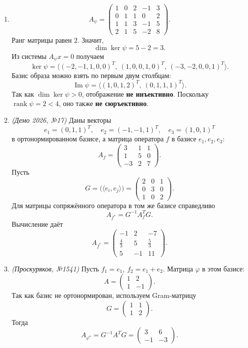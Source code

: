 \begin{enumerate}
\item
\[
A_\psi=\begin{pmatrix}
1&0&2&-1&3\\
0&1&1&0&2\\
1&1&3&-1&5\\
2&1&5&-2&8
\end{pmatrix}.
\]
Ранг матрицы равен \(2\). Значит,
\[
\dim\ker\psi=5-2=3.
\]
Из системы \(A_\psi x=0\) получаем
\[
\ker\psi=\langle (-2,-1,1,0,0)^T,\ (1,0,0,1,0)^T,\ (-3,-2,0,0,1)^T\rangle.
\]
Базис образа можно взять по первым двум столбцам:
\[
\operatorname{Im}\psi=\langle (1,0,1,2)^T,\ (0,1,1,1)^T\rangle.
\]
Так как \(\dim\ker\psi>0\), отображение \textbf{не инъективно}. Поскольку \(\operatorname{rank}\psi=2<4\), оно также \textbf{не сюръективно}.

\item \textit{(Демо 2026, №17)}
Даны векторы
\[
e_1=(0,1,1)^T,\quad e_2=(-1,-1,1)^T,\quad e_3=(1,0,1)^T
\]
в ортонормированном базисе, а матрица оператора \(f\) в базисе \(e_1,e_2,e_3\):
\[
A_f=\begin{pmatrix}
3&1&1\\
1&5&0\\
-3&2&7
\end{pmatrix}.
\]
Пусть
\[
G=\bigl(\langle e_i,e_j\rangle\bigr)=
\begin{pmatrix}
2&0&1\\
0&3&0\\
1&0&2
\end{pmatrix}.
\]
Для матрицы сопряжённого оператора в том же базисе справедливо
\[
A_{f^*}=G^{-1}A_f^T G.
\]
Вычисление даёт
\[
A_{f^*}=
\begin{pmatrix}
-1&2&-7\\
\frac43&5&\frac53\\
5&-1&11
\end{pmatrix}.
\]

\item \textit{(Проскуряков, №1541)}
Пусть \(f_1=e_1,\ f_2=e_1+e_2\). Матрица \(\varphi\) в этом базисе:
\[
A=\begin{pmatrix}1&2\\1&-1\end{pmatrix}.
\]
Так как базис не ортонормирован, используем Gram-матрицу
\[
G=\begin{pmatrix}1&1\\1&2\end{pmatrix}.
\]
Тогда
\[
A_{\varphi^*}=G^{-1}A^TG=
\begin{pmatrix}3&6\\-1&-3\end{pmatrix}.
\]


\end{enumerate}
